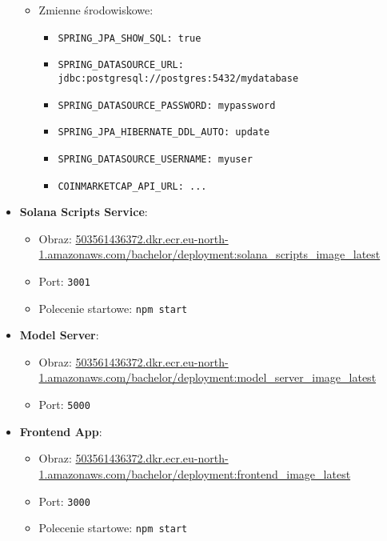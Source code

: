 \begin{itemize}
\begin{itemize}
        \item Zmienne środowiskowe:
        \begin{itemize}
            \item \texttt{SPRING\_JPA\_SHOW\_SQL: true}
            \item \texttt{SPRING\_DATASOURCE\_URL: jdbc:postgresql://postgres:5432/mydatabase}
            \item \texttt{SPRING\_DATASOURCE\_PASSWORD: mypassword}
            \item \texttt{SPRING\_JPA\_HIBERNATE\_DDL\_AUTO: update}
            \item \texttt{SPRING\_DATASOURCE\_USERNAME: myuser}
            \item \texttt{COINMARKETCAP\_API\_URL: ...}
        \end{itemize}
    \end{itemize}
    \item \textbf{Solana Scripts Service}:
    \begin{itemize}
        \item Obraz: \url{503561436372.dkr.ecr.eu-north-1.amazonaws.com/bachelor/deployment:solana_scripts_image_latest}
        \item Port: \texttt{3001}
        \item Polecenie startowe: \texttt{npm start}
    \end{itemize}
    \item \textbf{Model Server}:
    \begin{itemize}
        \item Obraz: \url{503561436372.dkr.ecr.eu-north-1.amazonaws.com/bachelor/deployment:model_server_image_latest}
        \item Port: \texttt{5000}
    \end{itemize}
    \item \textbf{Frontend App}:
    \begin{itemize}
        \item Obraz: \url{503561436372.dkr.ecr.eu-north-1.amazonaws.com/bachelor/deployment:frontend_image_latest}
        \item Port: \texttt{3000}
        \item Polecenie startowe: \texttt{npm start}
    \end{itemize}
\end{itemize}

